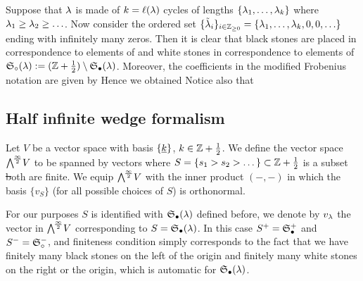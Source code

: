 \documentclass[10pt,handout]{beamer} %
\begin{document}
\begin{frame}

Suppose that $\lambda$ is made of $k=\ell(\lambda)$ cycles of lengths $\{\lambda_1,\ldots,\lambda_k\}$ where $\lambda_1\geq\lambda_2\geq\ldots$. Now consider the ordered set $\{\tilde {\lambda}_i\}_{i\in\mathbb Z_{\geq0}}=\{\lambda_1,\ldots,\lambda_k,0,0,\ldots\}$ ending with infinitely many zeros. Then it is clear that black stones are placed in correspondence to elements of 
and white stones in correspondence to elements of $\mathfrak S_\circ(\lambda):=(\mathbb Z+\frac12)\setminus\mathfrak S_\bullet(\lambda)$. \pause  Moreover, the coefficients in the modified Frobenius notation are given by
\pause
Hence we obtained
\pause
Notice also that

\end{frame}

\subsection{Half infinite wedge formalism}

\begin{frame}

\begin{definition}

Let $V$ be a vector space with basis $\{\underline{k}\}$, $k\in\mathbb Z+\frac12$. We define the vector space $\bigwedge^{\!\frac\infty2}\!V$ to be spanned by vectors
where $S=\{s_1>s_2>\dots\}\subset\mathbb Z+\frac12$ is a subset \st both
are finite. We equip $\bigwedge^{\!\frac\infty2}\!V$ with the inner product $(-,-)$ in which the basis $\{v_S\}$ (for all possible choices of $S$) is orthonormal. 

\end{definition}\pause

For our purposes $S$ is identified with $\mathfrak S_\bullet(\lambda)$ defined before, we denote by $v_\lambda$ the vector in $\bigwedge^{\!\frac\infty2}\!V$ corresponding to $S=\mathfrak S_\bullet(\lambda)$. In this case $S^+=\mathfrak S_\bullet^+$ and $S^-=\mathfrak S_\circ^-$, and finiteness condition simply corresponds to the fact that we have finitely many black stones on the left of the origin and finitely many white stones on the right or the origin, which is automatic for $\mathfrak S_\bullet(\lambda)$. 

\end{frame}
\end{document}
